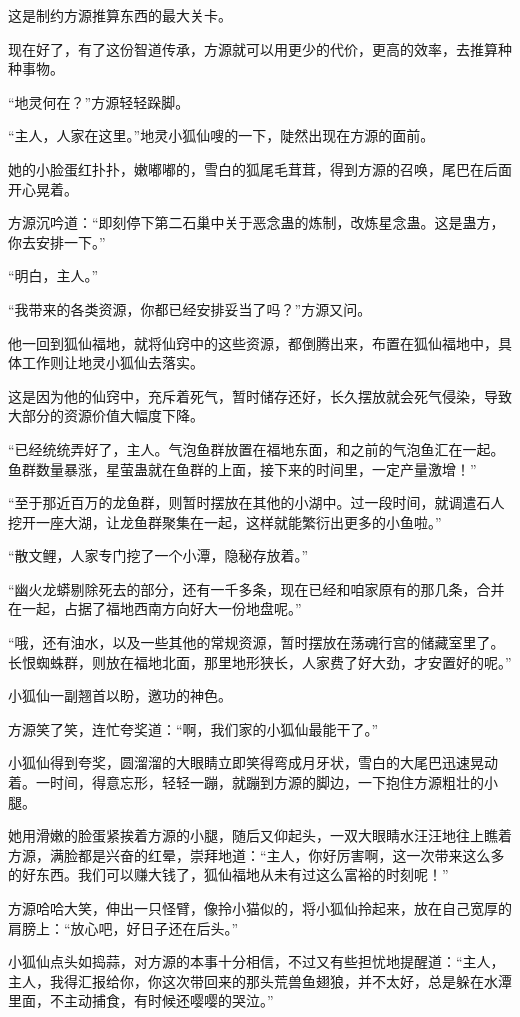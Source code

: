 \begin{this_body}
这是制约方源推算东西的最大关卡。

现在好了，有了这份智道传承，方源就可以用更少的代价，更高的效率，去推算种种事物。

“地灵何在？”方源轻轻跺脚。

“主人，人家在这里。”地灵小狐仙嗖的一下，陡然出现在方源的面前。

她的小脸蛋红扑扑，嫩嘟嘟的，雪白的狐尾毛茸茸，得到方源的召唤，尾巴在后面开心晃着。

方源沉吟道：“即刻停下第二石巢中关于恶念蛊的炼制，改炼星念蛊。这是蛊方，你去安排一下。”

“明白，主人。”

“我带来的各类资源，你都已经安排妥当了吗？”方源又问。

他一回到狐仙福地，就将仙窍中的这些资源，都倒腾出来，布置在狐仙福地中，具体工作则让地灵小狐仙去落实。

这是因为他的仙窍中，充斥着死气，暂时储存还好，长久摆放就会死气侵染，导致大部分的资源价值大幅度下降。

“已经统统弄好了，主人。气泡鱼群放置在福地东面，和之前的气泡鱼汇在一起。鱼群数量暴涨，星萤蛊就在鱼群的上面，接下来的时间里，一定产量激增！”

“至于那近百万的龙鱼群，则暂时摆放在其他的小湖中。过一段时间，就调遣石人挖开一座大湖，让龙鱼群聚集在一起，这样就能繁衍出更多的小鱼啦。”

“散文鲤，人家专门挖了一个小潭，隐秘存放着。”

“幽火龙蟒剔除死去的部分，还有一千多条，现在已经和咱家原有的那几条，合并在一起，占据了福地西南方向好大一份地盘呢。”

“哦，还有油水，以及一些其他的常规资源，暂时摆放在荡魂行宫的储藏室里了。长恨蜘蛛群，则放在福地北面，那里地形狭长，人家费了好大劲，才安置好的呢。”

小狐仙一副翘首以盼，邀功的神色。

方源笑了笑，连忙夸奖道：“啊，我们家的小狐仙最能干了。”

小狐仙得到夸奖，圆溜溜的大眼睛立即笑得弯成月牙状，雪白的大尾巴迅速晃动着。一时间，得意忘形，轻轻一蹦，就蹦到方源的脚边，一下抱住方源粗壮的小腿。

她用滑嫩的脸蛋紧挨着方源的小腿，随后又仰起头，一双大眼睛水汪汪地往上瞧着方源，满脸都是兴奋的红晕，崇拜地道：“主人，你好厉害啊，这一次带来这么多的好东西。我们可以赚大钱了，狐仙福地从未有过这么富裕的时刻呢！”

方源哈哈大笑，伸出一只怪臂，像拎小猫似的，将小狐仙拎起来，放在自己宽厚的肩膀上：“放心吧，好日子还在后头。”

小狐仙点头如捣蒜，对方源的本事十分相信，不过又有些担忧地提醒道：“主人，主人，我得汇报给你，你这次带回来的那头荒兽鱼翅狼，并不太好，总是躲在水潭里面，不主动捕食，有时候还嘤嘤的哭泣。”


\end{this_body}
